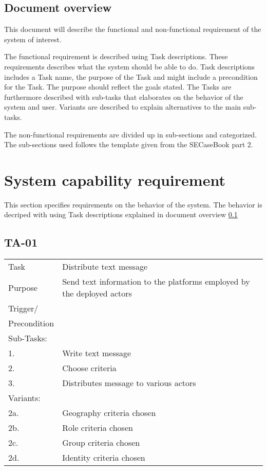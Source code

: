 \subsection{Document overview}
\label{sec_documentOverview}
This document will describe the functional and non-functional requirement of the system of interest. 

The functional requirement is described using Task descriptions. These requirements describes what the system should be able to do. Task descriptions includes a Task name, the purpose of the Task and might include a precondition for the Task. The purpose should reflect the goals stated. The Tasks are furthermore described with sub-tasks that elaborates on the behavior of the system and user.  Variants are described to explain alternatives to the main sub-tasks. \citep{taskDescription}

The non-functional requirements are divided up in sub-sections and categorized. The sub-sections used follows the template given from the SECaseBook part 2. \citep{casebook}



\newpage
\section{System capability requirement}
This section specifies requirements on the behavior of the system. The behavior is decriped with using Task descriptions explained in document overview \ref{sec_documentOverview}

\subsection{TA-01}
\begin{longtable}{| p{2.5cm}  | p{10cm} |  }
	\hline
	Task & Distribute text message \\
	Purpose & Send text information to the platforms employed by the  deployed actors \\
	Trigger/ &  \\ Precondition &  \\
	\hline
	Sub-Tasks: & \\
	1. & Write text message\\
	2. & Choose criteria \\
	3. & Distributes message to various actors \\
	\hline
	Variants: & \\
	2a. & Geography criteria chosen \\
	2b. & Role criteria chosen\\
	2c. & Group criteria chosen\\
	2d. & Identity criteria chosen\\
	\hline
\end{longtable}



